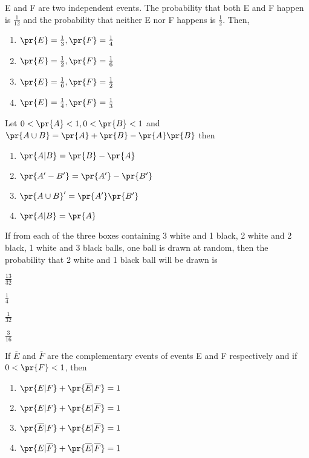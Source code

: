 \item E and F are two independent events. The probability that both E and F happen is $\frac{1}{12}$ and the probability that neither E nor F happens is $\frac{1}{2}$. Then,
\hfill{}
\begin{enumerate}
\item $\pr{E}=\frac{1}{3},\pr{F}=\frac{1}{4}$
\item $\pr{E}=\frac{1}{2},\pr{F}=\frac{1}{6}$
\item $\pr{E}=\frac{1}{6},\pr{F}=\frac{1}{2}$
\item $\pr{E}=\frac{1}{4},\pr{F}=\frac{1}{3}$
\end{enumerate}
\item Let $0<\pr{A}<1,0<\pr{B}<1$ and $\pr{A\cup B}=\pr{A}+\pr{B}-\pr{A}\pr{B}$ then
\hfill{}
\begin{enumerate}
\item $\pr{A|B}=\pr{B}-\pr{A}$
\item $\pr{A'-B'}=\pr{A'}-\pr{B'}$
\item $\pr{A\cup B}'=\pr{A'}\pr{B'}$
\item $\pr{A|B}=\pr{A}$
\end{enumerate}
\item If from each of the three boxes containing 3 white and 1 black, 2 white and 2 black, 1 white and 3 black balls, one ball is drawn at random, then the probability that 2 white and 1 black ball will be drawn is
\hfill{}
\begin{enumerate}
\begin{multicols}{4}
\item $\frac{13}{32}$
\item $\frac{1}{4}$
\item $\frac{1}{32}$
\item $\frac{3}{16}$
\end{multicols} 
\end{enumerate}
\item If $\overline{E}$ and $\overline{F}$ are the complementary events of events E and F respectively and if $0<\pr{F}<1$, then
\hfill{}
\begin{enumerate}
\item $\pr{E|F}+\pr{\overline{E}|F}=1$
\item $\pr{E|F}+\pr{E|\overline{F}}=1$
\item $\pr{\overline{E}|F}+\pr{E|\overline{F}}=1$
\item $\pr{E|\overline{F}}+\pr{\overline{E}|\overline{F}}=1$
\end{enumerate}
